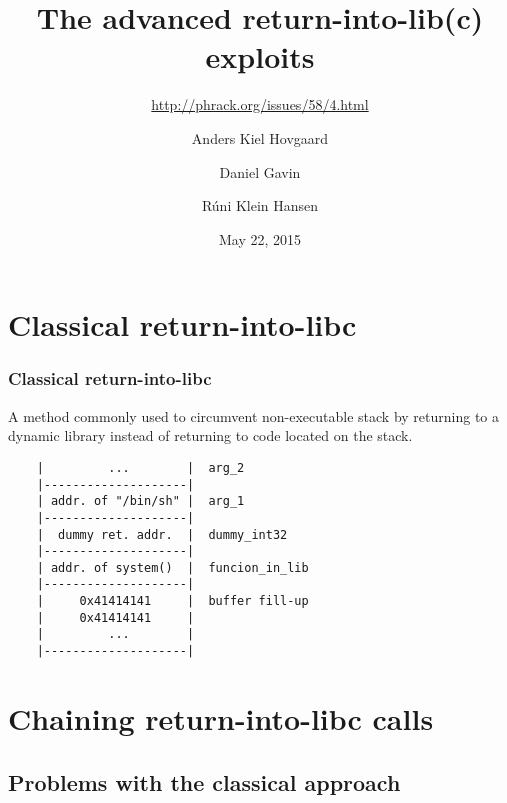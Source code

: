 \documentclass[10pt]{beamer}
\title{The advanced return-into-lib(c) exploits}
\subtitle{\url{http://phrack.org/issues/58/4.html}}
\author{Anders Kiel Hovgaard \and Daniel Gavin \and Rúni Klein Hansen}
\institute{Department of Computer Science, University of Copenhagen}
\date{May 22, 2015}
\begin{document}
\frame{\titlepage}

\section{Classical return-into-libc}  %

\begin{frame}[fragile]
  \frametitle{Classical return-into-libc}

  A method commonly used to circumvent non-executable stack by returning to a
  dynamic library instead of returning to code located on the stack.

  \begin{verbatim}
    |         ...        |  arg_2
    |--------------------|
    | addr. of "/bin/sh" |  arg_1
    |--------------------|
    |  dummy ret. addr.  |  dummy_int32
    |--------------------|
    | addr. of system()  |  funcion_in_lib
    |--------------------|
    |     0x41414141     |  buffer fill-up
    |     0x41414141     |
    |         ...        |
    |--------------------|
  \end{verbatim}
\end{frame}


\section{Chaining return-into-libc calls} %

\subsection{Problems with the classical approach}
\end{document}
